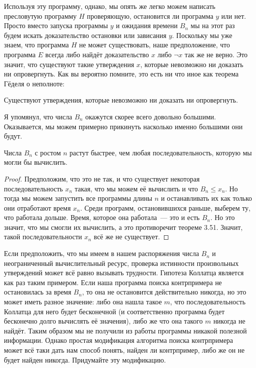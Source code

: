 Используя эту программу, однако, мы опять же легко можем написать пресловутую программу $H$ проверяющую, остановится ли программа $y$ или нет. Просто вместо запуска программы $y$ и ожидания времени $B_n$ мы на этот раз будем искать доказательство остановки или зависания $y$. Поскольку мы уже знаем, что программа $H$ не может существовать, наше предположение, что программа $E$ всегда либо найдёт доказательство $x$ либо $\neg x$ так же не верно. Это значит, что существуют такие утверждения $x$, которые невозможно ни доказать ни опровергнуть. Как вы вероятно помните, это есть ни что иное как теорема Гёделя о неполноте:

\begin{thm}
Существуют утверждения, которые невозможно ни доказать ни опровергнуть.
\end{thm}

Я упомянул, что числа $B_n$ окажутся скорее всего довольно большими. Оказывается, мы можем примерно прикинуть насколько именно большими они будут.

\begin{thm}
Числа $B_n$ с ростом $n$ растут быстрее, чем любая последовательность, которую мы могли бы вычислить.
\end{thm}
\begin{proof}
Предположим, что это не так, и что существует некоторая последовательность $x_n$ такая, что мы можем её вычислить и что $B_n\le x_n$. Но тогда мы можем запустить все программы длины $n$ и останавливать их как только они отработают время $x_n$. Среди программ, остановившихся раньше, выберем ту, что работала дольше. Время, которое она работала~--- это и есть $B_n$. Но это значит, что мы смогли их вычислить, а это противоречит теореме 3.51. Значит, такой последовательности $x_n$ всё же не существует.
\end{proof}

\begin{exercise}
Если предположить, что мы имеем в нашем распоряжения числа $B_n$ и неограниченный вычислительный ресурс, проверка истинности произвольных утверждений может всё равно вызывать трудности. Гипотеза Коллатца является как раз таким примером. Если наша программа поиска контрпримера не остановилась за время $B_n$, то она не остановится действительно никогда, но это может иметь разное значение: либо она нашла такое $m$, что последовательность Коллатца для него будет бесконечной (и соответственно программа будет бесконечно долго вычислять её значения), либо же что она такого $m$ никогда не найдёт. Таким образом мы не получили из работы программы никакой полезной информации. Однако простая модификация алгоритма поиска контрпримера может всё таки дать нам способ понять, найден ли контрпример, либо же он не будет найден никогда. Придумайте эту модификацию.
\end{exercise}

